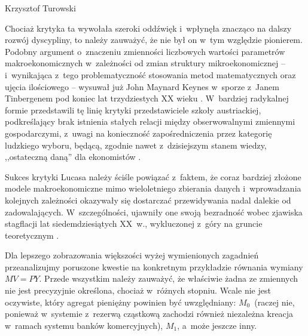 \begin{artplenv}{Krzysztof Turowski}

Chociaż krytyka ta wywołała szeroki oddźwięk i~wpłynęła znacząco na dalszy rozwój dyscypliny, to należy zauważyć, że nie
był on w~tym względzie pionierem. Podobny argument o~znaczeniu zmienności liczbowych wartości parametrów
makroekonomicznych w~zależności od zmian struktury mikroekonomicznej  --  i~wynikająca z~tego problematyczność
stosowania metod matematycznych oraz ujęcia ilościowego  --  wysuwał już John Maynard Keynes w~sporze z~Janem
Tinbergenem pod koniec lat trzydziestych XX wieku
\parencite{keynes_professor_1939}.
W~bardziej radykalnej formie
przedstawili tę linię krytyki przedstawiciele szkoły austriackiej, podkreślający brak istnienia stałych relacji między
obserwowalnymi zmiennymi gospodarczymi, z~uwagi na konieczność zapośredniczenia przez kategorię ludzkiego wyboru,
będącą, zgodnie nawet z~dzisiejszym stanem wiedzy, ,,ostateczną daną'' dla ekonomistów
\parencite{mises_ludzkie_2007,rothbard_praxeology:_1976}.

Sukces krytyki Lucasa należy ściśle powiązać z~faktem, że coraz bardziej złożone modele makroekonomiczne mimo
wieloletniego zbierania danych i~wprowadzania kolejnych zależności okazywały się dostarczać przewidywania nadal dalekie
od zadowalających. W~szczególności, ujawniły one swoją bezradność wobec zjawiska stagflacji lat siedemdziesiątych
XX~w., wykluczonej z~góry na gruncie teoretycznym
\parencite{kydland_econometrics_1991}.

Dla lepszego zobrazowania większości wyżej wymienionych zagadnień przeanalizujmy poruszone kwestie na konkretnym
przykładzie równania wymiany $MV = PY$. Przede wszystkim należy zauważyć, że właściwie żadna ze zmiennych nie
jest precyzyjnie określona, chociaż w~różnych stopniu. Wcale nie jest oczywiste, który agregat pieniężny powinien być
uwzględniany: $M_0$~(raczej nie, ponieważ w~systemie z~rezerwą cząstkową zachodzi
również niezależna kreacja w~ramach systemu banków komercyjnych), $M_1$, a~może jeszcze
inny.


\end{artplenv}
